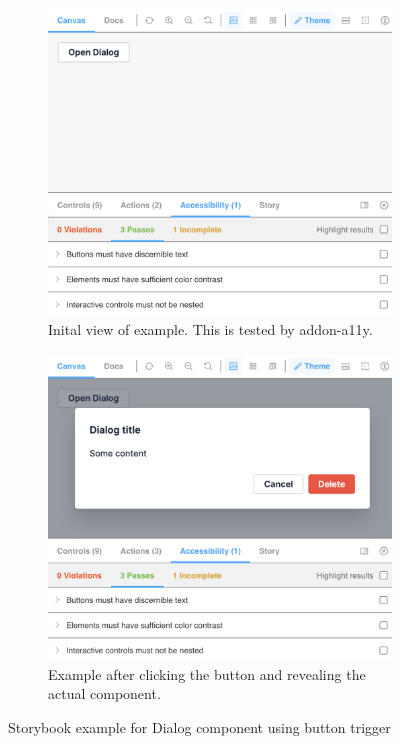 \documentclass{master_thesis}
\begin{document}
\begin{figure}[h]
	\begin{subfigure}{0.49\textwidth}
	\includegraphics[width=\textwidth]{img/sb-button-trigger.png}
	\caption{Inital view of example. This is tested by addon-a11y.}
	\label{fig:sb-button-trigger-1}
	\end{subfigure}
	\begin{subfigure}{0.49\textwidth}
	\includegraphics[width=\textwidth]{img/sb-button-trigger-open.png}
	\caption{Example after clicking the button and revealing the actual component.}
	\label{fig:sb-button-trigger-2}
	\end{subfigure}
\caption{Storybook example for Dialog component using button trigger}
\label{fig:sb-button-trigger}
\end{figure}
\end{document}
